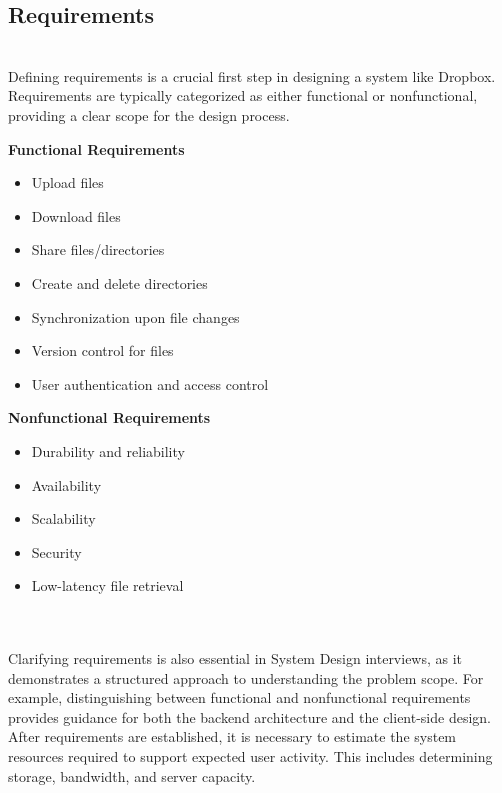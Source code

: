 \subsection{Requirements}\label{rwUPYXIJJuhAtnvHlnm1j}
\\
Defining requirements is a crucial first step in designing a system like Dropbox. Requirements are typically categorized as either functional or nonfunctional, providing a clear scope for the design process.

\noindent
\begin{minipage}[t]{0.48\textwidth}\vspace{0pt}
\textbf{Functional Requirements}
\begin{itemize}
    \item Upload files
    \item Download files
    \item Share files/directories
    \item Create and delete directories
    \item Synchronization upon file changes
    \item Version control for files
    \item User authentication and access control
\end{itemize}
\end{minipage}
\hfill
\begin{minipage}[t]{0.48\textwidth}\vspace{0pt}
\textbf{Nonfunctional Requirements}
\begin{itemize}
    \item Durability and reliability
    \item Availability
    \item Scalability
    \item Security
    \item Low-latency file retrieval
\end{itemize}
\end{minipage}
\\
\\
Clarifying requirements is also essential in System Design interviews, as it demonstrates a structured approach to understanding the problem scope. For example, distinguishing between functional and nonfunctional requirements provides guidance for both the backend architecture and the client-side design.
\\
After requirements are established, it is necessary to estimate the system resources required to support expected user activity. This includes determining storage, bandwidth, and server capacity.

